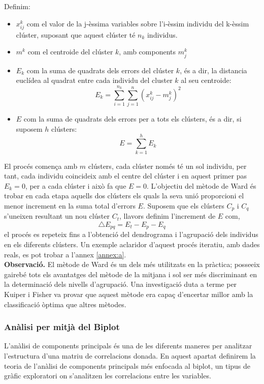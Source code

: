\documentclass[english]{article}
\begin{document}
Definim:
\begin{itemize}
\item $x_{ij}^k$ com el valor de la j-èssima variables sobre l'i-èssim individu del k-èssim clúster, suposant que aquest clúster té $n_k$ individus.
\item $m^k$ com el centroide del clúster $k$, amb components $m_{j}^k$
\item $E_k$ com la suma de quadrats dels errors del clúster $k$, és a dir, la distancia euclídea al quadrat entre cada individu del cluster $k$ al seu centroide:
\begin{equation*}
E_k = \sum_{i=1}^{n_k}\sum_{j=1}^{n}(x_{ij}^k - m_{j}^k)^2
\end{equation*}
\item $E$ com la suma de quadrats dels errors per a tots els clústers, és a dir, si suposem $h$ clústers:
\begin{equation*}
E = \sum_{k=1}^{h} E_k
\end{equation*}
\end{itemize}
El procés comen\c{c}a amb $m$ clústers, cada clúster només té un sol individu, per tant, cada individu coincideix amb el centre del clúster i en aquest primer pas $E_k=0$, per a cada clúster i això fa que $E=0$. L'objectiu del mètode de Ward és trobar en cada etapa aquells dos clústers els quals la seva unió proporcioni el menor increment en la suma total d'errors $E$. Suposem que els clústers $C_p$ i $C_q$ s'uneixen resultant un nou clúster $C_t$, llavors definim l'increment de $E$ com,
\begin{equation*}
\bigtriangleup E_{pq} = E_t - E_p - E_q
\end{equation*}
el procés es repeteix fins a l'obtenció del dendrograma i l'agrupació dels individus en els diferents clústers. Un exemple aclaridor d'aquest procés iteratiu, amb dades reals, es pot trobar a l'annex \ref{annex:a}.
\\

\textbf{Observació.} El mètode de Ward és un dels més utilitzats en la pràctica; posseeix gairebé tots els avantatges del mètode de la mitjana i sol ser més discriminant en la determinació dels nivells d'agrupació. Una investigació duta a terme per Kuiper i Fisher va provar que aquest mètode era capa\c{c} d'encertar millor amb la classificació òptima que altres mètodes.
\subsubsection{Anàlisi per mitjà del Biplot}
L'anàlisi de components principals és una de les diferents maneres per analitzar l'estructura d'una matriu de correlacions donada. En aquest apartat definirem la teoria de l'anàlisi de components principals més enfocada al biplot, un tipus de gràfic exploratori on s'analitzen les correlacions entre les variables.
\\
\end{document}
